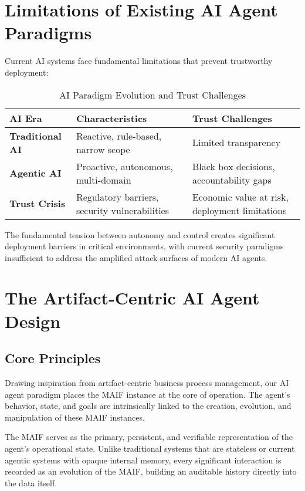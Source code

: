 \documentclass[conference]{IEEEtran}
\begin{document}
\section{Limitations of Existing AI Agent Paradigms}

Current AI systems face fundamental limitations that prevent trustworthy deployment:

\begin{table}[!t]
\renewcommand{\arraystretch}{1.3}
\caption{AI Paradigm Evolution and Trust Challenges}
\label{tab:ai-evolution}
\centering
\footnotesize
\begin{tabular}{p{2.5cm}p{2.5cm}p{2.5cm}}
\toprule
\textbf{AI Era} & \textbf{Characteristics} & \textbf{Trust Challenges} \\
\midrule
\textbf{Traditional AI} & Reactive, rule-based, narrow scope & Limited transparency \\
\textbf{Agentic AI} & Proactive, autonomous, multi-domain & Black box decisions, accountability gaps \\
\textbf{Trust Crisis} & Regulatory barriers, security vulnerabilities & Economic value at risk, deployment limitations \\
\bottomrule
\end{tabular}
\end{table}

The fundamental tension between autonomy and control creates significant deployment barriers in critical environments, with current security paradigms insufficient to address the amplified attack surfaces of modern AI agents.

\section{The Artifact-Centric AI Agent Design}

\subsection{Core Principles}

Drawing inspiration from artifact-centric business process management, our AI agent paradigm places the MAIF instance at the core of operation. The agent's behavior, state, and goals are intrinsically linked to the creation, evolution, and manipulation of these MAIF instances.

The MAIF serves as the primary, persistent, and verifiable representation of the agent's operational state. Unlike traditional systems that are stateless or current agentic systems with opaque internal memory, every significant interaction is recorded as an evolution of the MAIF, building an auditable history directly into the data itself.
\end{document}
